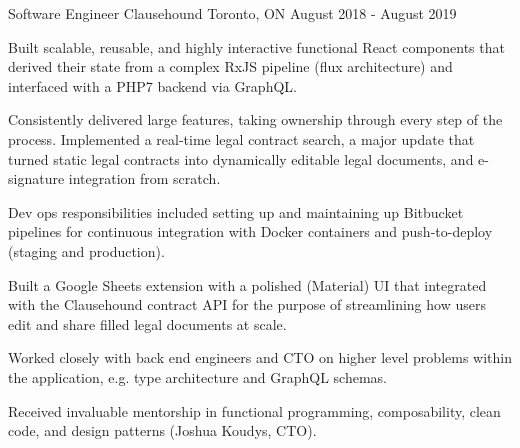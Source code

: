 \begin{cventries}
  \cventry
    {Software Engineer} %
    {Clausehound} %
    {Toronto, ON} %
    { August 2018 - August 2019} %
    {
      \begin{cvitems} %
        \item {Built scalable, reusable, and highly interactive functional React components that derived their state from a complex RxJS pipeline (flux architecture) and interfaced with a PHP7 backend via GraphQL.}
        \item {Consistently delivered large features, taking ownership through every step of the process. Implemented a real-time legal contract search, a major update that turned static legal contracts into dynamically editable legal documents, and e-signature integration from scratch.}
        \item {Dev ops responsibilities included setting up and maintaining up Bitbucket pipelines for continuous integration with Docker containers and push-to-deploy (staging and production).}
         \item {Built a Google Sheets extension with a polished (Material) UI that integrated with the Clausehound contract API for the purpose of streamlining how users edit and share filled legal documents at scale.}
         \item {Worked closely with back end engineers and CTO on higher level problems within the application, e.g. type architecture and GraphQL schemas.}
         \item {Received invaluable mentorship in functional programming, composability, clean code, and design patterns (Joshua Koudys, CTO).}
      \end{cvitems}
    }
%
\end{cventries}
